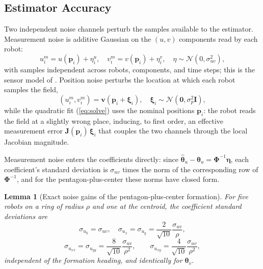 \documentclass[lettersize,journal]{IEEEtran}
\newtheorem{lemma}{Lemma}
\begin{document}
\subsection{Estimator Accuracy}
\label{sec:sensitivity}

Two independent noise channels perturb the samples available to the
estimator. Measurement noise is additive Gaussian on the $(u, v)$
components read by each robot:
\begin{equation}
    u_i^m = u(\mathbf{p}_i) + \eta_i^u, \quad
    v_i^m = v(\mathbf{p}_i) + \eta_i^v,
    \quad \eta \sim \mathcal{N}(0, \sigma_{uv}^2),
    \label{eq:meas_noise}
\end{equation}
with samples independent across robots, components, and time steps; this
is the sensor model of \cite{9}. Position noise perturbs the location at
which each robot samples the field,
\begin{equation}
    (u_i^m, v_i^m) = \mathbf{v}(\mathbf{p}_i + \boldsymbol{\xi}_i), \quad
    \boldsymbol{\xi}_i \sim \mathcal{N}(\mathbf{0}, \sigma_p^2 \mathbf{I}),
    \label{eq:pos_noise}
\end{equation}
while the quadratic fit (\ref{eq:solve}) uses the nominal positions
$\mathbf{p}_i$: the robot reads the field at a slightly wrong place,
inducing, to first order, an effective measurement error
$\mathbf{J}(\mathbf{p}_i)\,\boldsymbol{\xi}_i$ that couples the two
channels through the local Jacobian magnitude.

Measurement noise enters the coefficients directly: since
$\hat{\boldsymbol{\theta}}_u - \boldsymbol{\theta}_u =
\boldsymbol{\Phi}^{-1}\boldsymbol{\eta}$, each coefficient's standard
deviation is $\sigma_{uv}$ times the norm of the corresponding row of
$\boldsymbol{\Phi}^{-1}$, and for the pentagon-plus-center these norms
have closed form.

\begin{lemma}[Exact noise gains of the pentagon-plus-center formation]
\label{lem:gains}
For five robots on a ring of radius $\rho$ and one at the centroid, the
coefficient standard deviations are
\begin{equation}
    \sigma_{u_0} = \sigma_{uv}, \quad
    \sigma_{u_x} = \sigma_{u_y} = \frac{2}{\sqrt{10}}\frac{\sigma_{uv}}{\rho},
    \label{eq:gain_grad}
\end{equation}
\begin{equation}
    \sigma_{u_{xx}} = \sigma_{u_{yy}} = \frac{8}{\sqrt{10}}
    \frac{\sigma_{uv}}{\rho^2},
    \qquad
    \sigma_{u_{xy}} = \frac{4}{\sqrt{10}}\frac{\sigma_{uv}}{\rho^2},
    \label{eq:gain_hess}
\end{equation}
independent of the formation heading, and identically for
$\boldsymbol{\theta}_v$.
\end{lemma}
\end{document}

